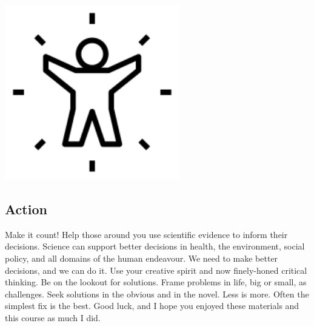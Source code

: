 \documentclass[
]{book}
\begin{document}
\includegraphics[width=3in,height=\textheight]{./life.png}

\hypertarget{action}{%
\subsection*{Action}\label{action}}

Make it count! Help those around you use scientific evidence to inform their decisions. Science can support better decisions in health, the environment, social policy, and all domains of the human endeavour. We need to make better decisions, and we can do it. Use your creative spirit and now finely-honed critical thinking. Be on the lookout for solutions. Frame problems in life, big or small, as challenges. Seek solutions in the obvious and in the novel. Less is more. Often the simplest fix is the best. Good luck, and I hope you enjoyed these materials and this course as much I did.

  
\end{document}
